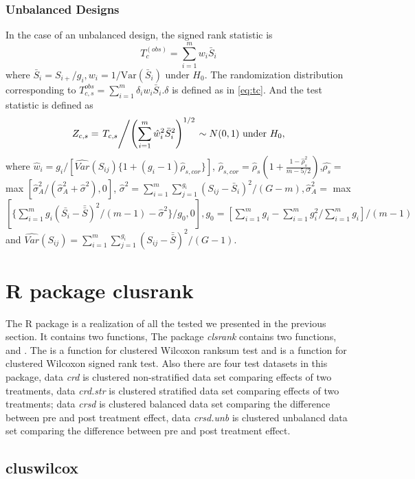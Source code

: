 \documentclass[article]{jss}
\begin{document}
\subsubsection{Unbalanced Designs}
In the case of an unbalanced design, the signed rank statistic is 
\begin{equation}
T_c^{(obs)} = \sum_{i = 1}^m w_i\bar{S}_i  
\end{equation}
where $\bar{S}_i = S_{i+}/{g_i}, w_i = 1/\text{Var}(\bar{S}_i)$ under $H_0$. 
The randomization distribution corresponding to $T_{c,s}^{obs} = \sum^m_{i=1}\delta_iw_i\bar{S}_i$.$\delta$ is defined as in \eqref{eq:tc}.
And the test statistic is defined as 
\begin{equation}
Z_{c,s} = \left.T_{c,s}\middle/ \left(\sum_{i=1}^m\hat{w}^2_i\bar{S}^2_i\right)^{1/2}\right. \sim N(0,1) \text{ under }H_0,
\end{equation}
where $\hat{w}_i = g_i/[\widehat{Var}(S_{ij})\{1 + (g_i-1)\hat{\rho}_{s,cor}\}]$, $\hat{\rho}_{s,cor} = \hat{\rho}_s\left(1 + \frac{1 - \hat{\rho}_s^2}{m - 5/2}\right)$,$\hat{\rho_s} = $ max $[\hat{\sigma}_A^2/(\hat{\sigma}_A^2 + \hat{\sigma}^2), 0]$, $\hat{\sigma
}^2 = \sum_{i=1}^m\sum_{j=1}^{g_i}(S_{ij} - \bar{S}_i)^2/(G-m), \hat{\sigma}^2_A = $ max $[\{\sum_{i=1}^mg_i(\bar{S_i}- \bar{\bar{S}})^2/(m-1)- \hat{\sigma}^2\}/g_0,0], g_0 = [\sum_{i=1}^mg_i - \sum_{i=1}^mg_i^2/\sum_{i=1}^mg_i]/(m-1)$ and $\widehat{Var}(S_{ij}) = \sum_{i=1}^m\sum_{j=1}^{g_i}(S_{ij} - \bar{\bar{S}})^2/(G-1)$.

\section{R package clusrank}
The R package is a realization of all the tested we presented in the previous section. It contains two functions, 
The package \emph{clsrank} contains two functions, 
and . The  is a function for
clustered Wilcoxon ranksum test and  is a function
for clustered Wilcoxon signed rank test. Also there are four test
datasets in this package, data \emph{crd} is clustered non-stratified
data set comparing effects of two treatments, data \emph{crd.str} is
clustered stratified data set comparing effects of two treatments; data
\emph{crsd} is clustered balanced data set comparing the difference
between pre and post treatment effect, data \emph{crsd.unb} is clustered
unbalancd data set comparing the difference between pre and post
treatment effect.

\subsection{cluswilcox}\label{cluswilcox}
\end{document}
